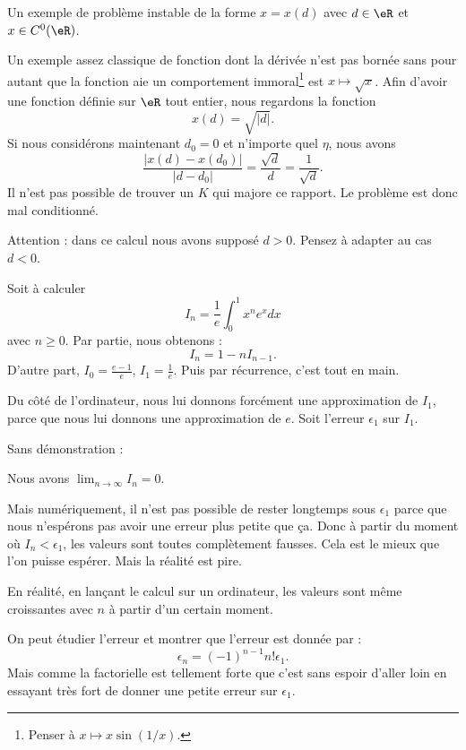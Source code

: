 \begin{example} \label{PIluknK}
	Un exemple de problème instable de la forme \( x=x(d)\) avec \( d\in\eR\) et \( x \in C^0(\eR)\).

	Un exemple assez classique de fonction dont la dérivée n'est pas bornée sans pour autant que la fonction aie un comportement immoral\footnote{Penser à \( x\mapsto x\sin(1/x)\).} est \( x\mapsto\sqrt{x}\). Afin d'avoir une fonction définie sur \( \eR\) tout entier, nous regardons la fonction
	\begin{equation}
		x(d)=\sqrt{|d|}.
	\end{equation}
	Si nous considérons maintenant \( d_0=0\) et n'importe quel \( \eta\), nous avons
	\begin{equation}
		\frac{ | x(d)-x(d_0) | }{ | d-d_0 | }=\frac{ \sqrt{d} }{ d }=\frac{1}{ \sqrt{d} }.
	\end{equation}
	Il n'est pas possible de trouver un \( K\) qui majore ce rapport. Le problème est donc mal conditionné.

	Attention : dans ce calcul nous avons supposé \( d>0\). Pensez à adapter au cas \( d<0\).
\end{example}

\begin{example}
	Soit à calculer
	\begin{equation}
		I_n=\frac{1}{ e }\int_0^1x^ne^xdx
	\end{equation}
	avec \( n\geq 0\). Par partie, nous obtenons :
	\begin{equation}
		I_n=1-nI_{n-1}.
	\end{equation}
	D'autre part, \( I_0=\frac{ e-1 }{ e }\), \( I_1=\frac{1}{ e }\). Puis par récurrence, c'est tout en main.

	Du côté de l'ordinateur, nous lui donnons forcément une approximation de \( I_1\), parce que nous lui donnons une approximation de \( e\). Soit l'erreur \( \epsilon_1\) sur \( I_1\).

	Sans démonstration :
	\begin{lemma}
		Nous avons \( \lim_{n\to \infty} I_n=0\).
	\end{lemma}
	Mais numériquement, il n'est pas possible de rester longtemps sous \( \epsilon_1\) parce que nous n'espérons pas avoir une erreur plus petite que ça. Donc à partir du moment où \( I_n<\epsilon_1\), les valeurs sont toutes complètement fausses. Cela est le mieux que l'on puisse espérer. Mais la réalité est pire.

	En réalité, en lançant le calcul sur un ordinateur, les valeurs sont même croissantes avec \( n\) à partir d'un certain moment.

	On peut étudier l'erreur et montrer que l'erreur est donnée par :
	\begin{equation}
		\epsilon_n=(-1)^{n-1}n!\epsilon_1.
	\end{equation}
	Mais comme la factorielle est tellement forte que c'est sans espoir d'aller loin en essayant très fort de donner une petite erreur sur \( \epsilon_1\).

\end{example}

